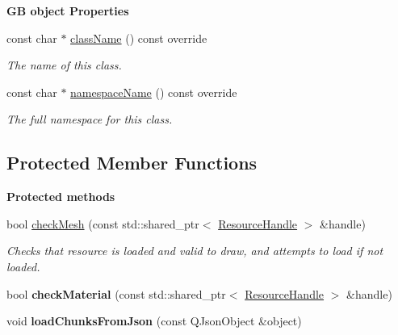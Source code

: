 \begin{Indent}\textbf{ GB object Properties}\par
\begin{DoxyCompactItemize}
\item 
const char $\ast$ \mbox{\hyperlink{classrev_1_1_model_a5294b11c432c67e5e89b76af767d9305}{class\+Name}} () const override
\begin{DoxyCompactList}\small\item\em The name of this class. \end{DoxyCompactList}\item 
const char $\ast$ \mbox{\hyperlink{classrev_1_1_model_ab005d0b8d9815c0cfa80a01f46fb8a38}{namespace\+Name}} () const override
\begin{DoxyCompactList}\small\item\em The full namespace for this class. \end{DoxyCompactList}\end{DoxyCompactItemize}
\end{Indent}
\subsection*{Protected Member Functions}
\begin{Indent}\textbf{ Protected methods}\par
\begin{DoxyCompactItemize}
\item 
\mbox{\label{classrev_1_1_model_a90268a56a0fc04b229c8fee25b407e6e}} 
bool \mbox{\hyperlink{classrev_1_1_model_a90268a56a0fc04b229c8fee25b407e6e}{check\+Mesh}} (const std\+::shared\+\_\+ptr$<$ \mbox{\hyperlink{classrev_1_1_resource_handle}{Resource\+Handle}} $>$ \&handle)
\begin{DoxyCompactList}\small\item\em Checks that resource is loaded and valid to draw, and attempts to load if not loaded. \end{DoxyCompactList}\item 
\mbox{\label{classrev_1_1_model_aa4b1ad306918803d9a687c0beab92b8c}} 
bool {\bfseries check\+Material} (const std\+::shared\+\_\+ptr$<$ \mbox{\hyperlink{classrev_1_1_resource_handle}{Resource\+Handle}} $>$ \&handle)
\item 
\mbox{\label{classrev_1_1_model_a61f577407a48c0e1ef99f82d68e9e1e0}} 
void {\bfseries load\+Chunks\+From\+Json} (const Q\+Json\+Object \&object)
\end{DoxyCompactItemize}
\end{Indent}
